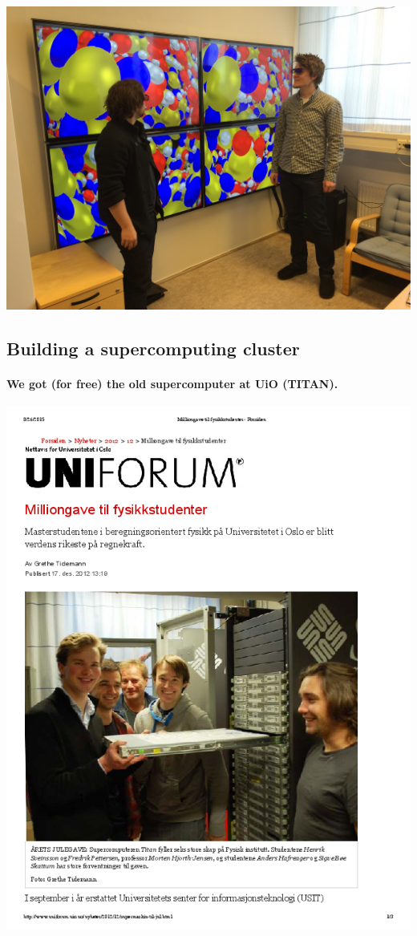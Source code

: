 \documentclass[%
oneside,                 %
final,                   %
10pt]{article}
\begin{document}
\centerline{\includegraphics[width=0.7\linewidth]{fig-future/visualize.jpg}}




\subsection{Building a supercomputing cluster}

\paragraph{We got (for free) the old supercomputer at UiO (TITAN).}


\centerline{\includegraphics[width=0.7\linewidth]{fig-future/uniforum-0.png}}
\end{document}
